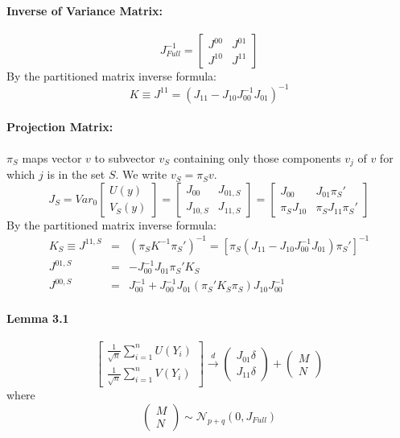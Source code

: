 \documentclass[12pt]{article}
\theoremstyle{definition}
\begin{document}
\paragraph{Inverse of Variance Matrix:}
	$$
	J_{Full}^{-1} = \left[\begin{array}{cc}
		J^{00} & J^{01}\\
		J^{10} & J^{11}
	\end{array}\right]
$$
By the partitioned matrix inverse formula:
	$$
	K \equiv J^{11} = (J_{11} - J_{10}J_{00}^{-1}J_{01})^{-1}
$$
\paragraph{Projection Matrix:} $\pi_S$ maps vector $v$ to subvector $v_S$ containing only those components $v_j$ of $v$ for which $j$ is in the set $S$. We write $v_S = \pi_S v$.
	$$
	J_S = Var_0\left[\begin{array}{c}
		U(y)\\
		V_S(y)
\end{array}\right]=\left[\begin{array}{cc}
		J_{00} & J_{01,S}\\
		J_{10,S} & J_{11,S}
	\end{array}\right]=\left[\begin{array}{cc}
		J_{00} & J_{01}\pi_S'\\
		\pi_S J_{10} & \pi_S J_{11} \pi_S'
	\end{array}\right]
$$
By the partitioned matrix inverse formula:
\begin{eqnarray*}
	K_S \equiv J^{11,S} &=& \left(\pi_S K^{-1} \pi_S'\right)^{-1} = \left[\pi_S \left(J_{11} - J_{10}J_{00}^{-1}J_{01} \right) \pi_S'\right]^{-1} \\
	J^{01,S} &=& -J_{00}^{-1}J_{01}\pi_S'K_S\\
	J^{00,S} &=& J_{00}^{-1} + J_{00}^{-1}J_{01}\left(\pi_S'K_S\pi_S \right)J_{10}J_{00}^{-1}
\end{eqnarray*}

\paragraph{Lemma 3.1}
	$$
	\left[\begin{array}{c}
		\frac{1}{\sqrt{n}}\sum_{i=1}^n U(Y_i)\\
		\frac{1}{\sqrt{n}}\sum_{i=1}^n V(Y_i)
	\end{array}\right] \overset{d}{\rightarrow}
	\left(\begin{array}{c}
		J_{01}\delta\\
		J_{11}\delta
	\end{array}\right) + 	
	\left(\begin{array}{c}
		M\\
		N
	\end{array}\right)
$$
where
	$$
	\left(\begin{array}{c}
		M\\
		N
	\end{array}\right) \sim \mathcal{N}_{p+q}(0, J_{Full})
$$
\end{document}
